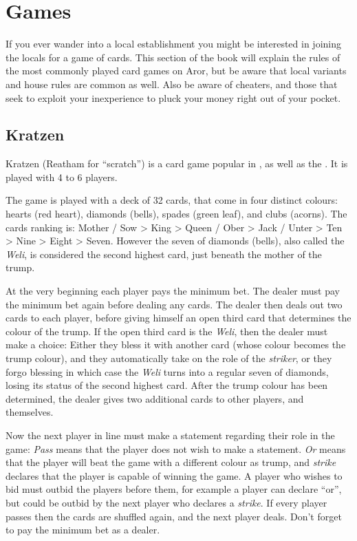 \section{Games}
\label{sec:Games}

If you ever wander into a local establishment you might be interested in
joining the locals for a game of cards. This section of the book will explain
the rules of the most commonly played card games on Aror, but be aware that
local variants and house rules are common as well. Also be aware of cheaters,
and those that seek to exploit your inexperience to pluck your money right
out of your pocket.

\subsection{Kratzen}
\label{sec:Kratzen}

Kratzen (Reatham for ``scratch'') is a card game popular in
, as well as the . It is
played with 4 to 6 players.

The game is played with a deck of 32 cards, that come in four distinct
colours: hearts (red heart), diamonds (bells), spades (green leaf), and clubs
(acorns). The cards ranking is: Mother / Sow > King > Queen / Ober > Jack /
Unter > Ten > Nine > Eight > Seven. However the seven of diamonds (bells),
also called the \emph{Weli}, is considered the second highest card, just beneath
the mother of the trump.

At the very beginning each player pays the minimum bet. The dealer must pay
the minimum bet again before dealing any cards. The dealer then deals out two
cards to each player, before giving himself an open third card that determines
the colour of the trump. If the open third card is the \emph{Weli}, then the
dealer must make a choice: Either they bless it with another card (whose
colour becomes the trump colour), and they automatically take on the role of
the \emph{striker}, or they forgo blessing in which case the \emph{Weli} turns
into a regular seven of diamonds, losing its status of the second highest
card. After the trump colour has been determined, the dealer gives two
additional cards to other players, and themselves.

Now the next player in line must make a statement regarding their role in the
game: \emph{Pass} means that the player does not wish to make a
statement. \emph{Or} means that the player will beat the game with a different
colour as trump, and \emph{strike} declares that the player is capable of
winning the game. A player who wishes to bid must outbid the players before
them, for example a player can declare ``or'', but could be outbid by the next
player who declares a \emph{strike}. If every player passes then the cards are
shuffled again, and the next player deals. Don't forget to pay the minimum bet
as a dealer.

